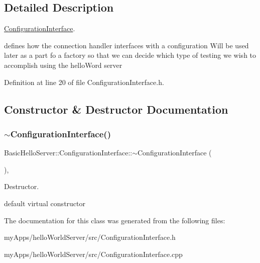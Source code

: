 \subsection{Detailed Description}
\mbox{\hyperlink{classBasicHelloServer_1_1ConfigurationInterface}{Configuration\+Interface}}. 

defines how the connection handler interfaces with a configuration Will be used later as a part fo a factory so that we can decide which type of testing we wish to accomplish using the hello\+Word server 

Definition at line 20 of file Configuration\+Interface.\+h.



\subsection{Constructor \& Destructor Documentation}
\mbox{\label{classBasicHelloServer_1_1ConfigurationInterface_a7d175c98ee86cab421e3eefe8a84a826}} 
\subsubsection{\texorpdfstring{$\sim$ConfigurationInterface()}{~ConfigurationInterface()}}
{\footnotesize\ttfamily Basic\+Hello\+Server\+::\+Configuration\+Interface\+::$\sim$\+Configuration\+Interface (\begin{DoxyParamCaption}{ }\end{DoxyParamCaption})\hspace{0.3cm}{\ttfamily [pure virtual]}, {\ttfamily [default]}}



Destructor. 

default virtual constructor 

The documentation for this class was generated from the following files\+:\begin{DoxyCompactItemize}
\item 
my\+Apps/hello\+World\+Server/src/Configuration\+Interface.\+h\item 
my\+Apps/hello\+World\+Server/src/Configuration\+Interface.\+cpp\end{DoxyCompactItemize}
